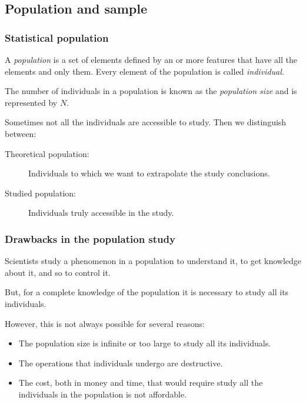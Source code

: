 \subsection{Population and sample}
\begin{frame}
\frametitle{Statistical population}
\begin{definition}[Population]
A \emph{population} is a set of elements defined by an or more features that have all the elements and only them.
Every element of the population is called \emph{individual}.
\end{definition}

\begin{definition}
The number of individuals in a population is known as the \emph{population size} and is represented by $N$.
\end{definition}

Sometimes not all the individuals are accessible to study.
Then we distinguish between:
\begin{description}
\item [Theoretical population:] Individuals to which we want to extrapolate the study conclusions.
\item [Studied population:] Individuals truly accessible in the study.
\end{description}
\end{frame}


\begin{frame}
\frametitle{Drawbacks in the population study}
Scientists study a phenomenon in a population to understand it, to get knowledge about it, and so to control it.

But, for a complete knowledge of the population it is necessary to study all its individuals.

However, this is not always possible for several reasons:
\begin{itemize}
\item The population size is infinite or too large to study all its individuals.
\item The operations that individuals undergo are destructive.
\item The cost, both in money and time, that would require study all the individuals in the population is not affordable.
\end{itemize}
\end{frame}


